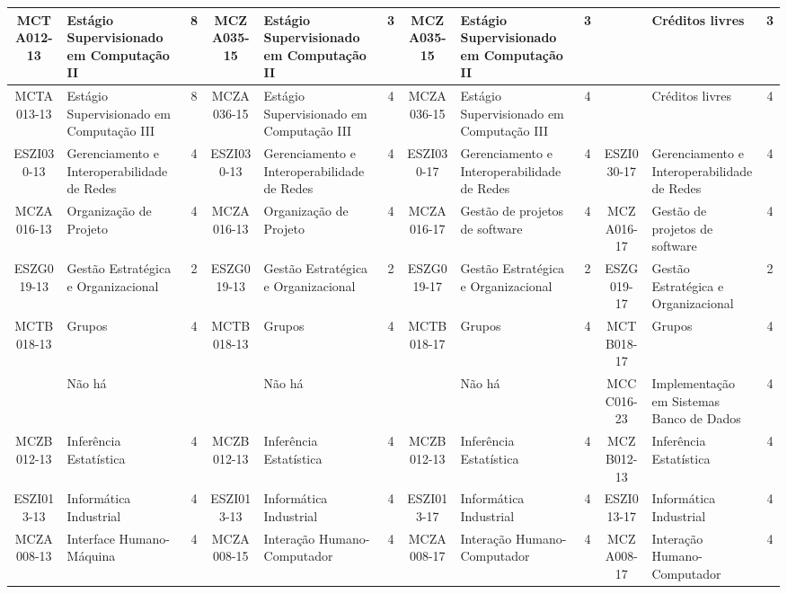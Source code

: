 \documentclass[a4paper]{article}
\begin{document}
\begin{landscape}
{\begin{longtable}{|c|p{.2\textheight}|c||c|p{.2\textheight}|c||c|p{.2\textheight}|c||c|p{.2\textheight}|c|}
MCTA012-13 & Estágio Supervisionado em Computação II& 8 &
MCZA035-15 & Estágio Supervisionado em Computação II & 3 &
MCZA035-15 & Estágio Supervisionado em Computação II & 3 &
& Créditos livres & 3 \\ \hline

MCTA013-13 & Estágio Supervisionado em Computação III& 8 &
MCZA036-15 & Estágio Supervisionado em Computação III & 4 &
MCZA036-15 & Estágio Supervisionado em Computação III & 4 &
& Créditos livres & 4\\ \hline

ESZI030-13 & Gerenciamento e Interoperabilidade de Redes & 4 &
ESZI030-13 & Gerenciamento e Interoperabilidade de Redes & 4 &
ESZI030-17 & Gerenciamento e Interoperabilidade de Redes & 4 & 
ESZI030-17 & Gerenciamento e Interoperabilidade de Redes & 4\\ \hline

MCZA016-13 & Organização de Projeto & 4 &
MCZA016-13 & Organização de Projeto & 4 &
MCZA016-17 & Gestão de projetos de software & 4 & 
MCZA016-17 & Gestão de projetos de software & 4\\ \hline

ESZG019-13 & Gestão Estratégica e Organizacional & 2 &
ESZG019-13 & Gestão Estratégica e Organizacional & 2 &
ESZG019-17 & Gestão Estratégica e Organizacional & 2 &
ESZG019-17 & Gestão Estratégica e Organizacional & 2\\ \hline

MCTB018-13 & Grupos & 4 &
MCTB018-13 & Grupos & 4 &
MCTB018-17 & Grupos & 4 &
MCTB018-17 & Grupos & 4\\ \hline

& Não há & &
& Não há & & 
& Não há & & 
MCCC016-23 & Implementação em Sistemas Banco de Dados & 4\\ \hline

MCZB012-13 & Inferência Estatística & 4 &
MCZB012-13 & Inferência Estatística & 4 &
MCZB012-13 & Inferência Estatística & 4 &
MCZB012-13 & Inferência Estatística & 4\\ \hline

ESZI013-13 & Informática Industrial & 4 &
ESZI013-13 & Informática Industrial & 4 &
ESZI013-17 & Informática Industrial & 4 & 
ESZI013-17 & Informática Industrial & 4\\ \hline

MCZA008-13 & Interface Humano-Máquina    & 4 &
MCZA008-15 & Interação Humano-Computador & 4 &
MCZA008-17 & Interação Humano-Computador & 4 &
MCZA008-17 & Interação Humano-Computador & 4\\ \hline


\end{longtable}}
\end{landscape}
\end{document}
